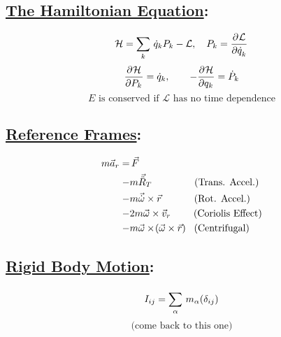 \documentclass[fleqn]{article}
\begin{document}
\begin{multicols*}{3}
\subsection*{ \centering \underline{The Hamiltonian Equation}:}
\[\mathcal{H} = \sum_{k}^{} \, \dot{q}_{k}P_{k} - \mathcal{L}, \quad P_{k} = \frac{\partial^{}{\mathcal{L}}}{\partial{\dot{q}_{k}}^{} }\]
\[\frac{\partial^{}{\mathcal{H}}}{\partial{P_{k}}^{} } = \dot{q}_{k},\qquad -\frac{\partial^{}{\mathcal{H}}}{\partial{q_{k}}^{} } = \dot{P}_{k}\]
\[E\mbox{ is conserved if $\mathcal{L}$ has no time dependence}\]

\subsection*{ \centering \underline{Reference Frames}:}
\begin{align*}
m\vec{a}_{r} = &\, \vec{F}\\ 
-&m\vec{\ddot{R}}_{T} \qquad\qquad \mbox{ (Trans. Accel.)}\\
-&m\vec{\dot{\omega}}\times\vec{r} \quad\qquad \mbox{ (Rot. Accel.)} \\
-&2m\vec{\omega}\times\vec{v}_r \qquad \mbox{ (Coriolis Effect)} \\
-&m\vec{\omega}\times\!\left({\vec{\omega} \times \vec{r}}\right) \,\, \mbox{ (Centrifugal)}
\end{align*}
\subsection*{ \centering \underline{Rigid Body Motion}:}
\[I_{ij} = \sum_{\alpha}^{} \, m_{\alpha}\!\left({\delta_{ij}}\right)\]
\[\mbox{(come back to this one)}\]
\columnbreak




\end{multicols*}
\end{document}
